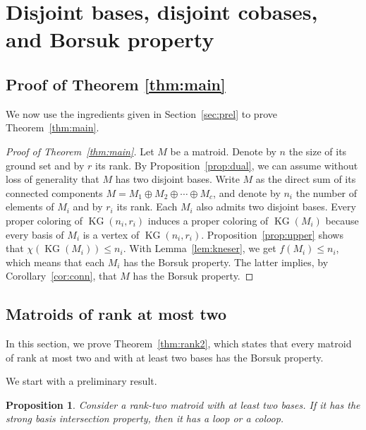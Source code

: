 \documentclass[12pt]{amsart}
\theoremstyle{plain}
\newtheorem{proposition}[theorem]{Proposition}
\theoremstyle{definition}
\theoremstyle{remark}
\renewcommand{\leq}{\leqslant}
\def \KG {\operatorname{KG}}
\begin{document}
\section{Disjoint bases, disjoint cobases, and Borsuk property}
 
\label{sec:disj-borsuk}

\subsection{Proof of Theorem \ref{thm:main}} 

We now use the ingredients given in Section~\ref{sec:prel} to prove Theorem~\ref{thm:main}.

\begin{proof}[Proof of Theorem~\ref{thm:main}]
Let $M$ be a matroid. Denote by $n$ the size of its ground set and by $r$ its rank. By Proposition~\ref{prop:dual}, we can assume without loss of generality that $M$ has two disjoint bases. Write $M$ as the direct sum of its connected components $M = M_1 \oplus M_2 \oplus \cdots \oplus M_c$, and denote by $n_i$ the number of elements of $M_i$ and by $r_i$ its rank. Each $M_i$ also admits two disjoint bases. Every proper coloring of $\KG(n_i,r_i)$ induces a proper coloring of $\KG(M_i)$ because every basis of $M_i$ is a vertex of $\KG(n_i,r_i)$. Proposition~\ref{prop:upper} shows that $\chi(\KG(M_i))\leq n_i$. With Lemma~\ref{lem:kneser}, we get $f(M_i) \leq n_i$, which means that each $M_i$ has the Borsuk property. The latter implies, by Corollary~\ref{cor:conn}, that $M$ has the Borsuk property.
\end{proof}

\subsection{Matroids of rank at most two}\label{subsec:m2}

In this section, we prove Theorem~\ref{thm:rank2}, which states that every matroid of rank at most two and with at least two bases has the Borsuk property.
 
We start with a preliminary result.

\begin{proposition}\label{prop:rank2}
Consider a rank-two matroid with at least two bases. If it has the strong basis intersection property, then it has a loop or a coloop.
\end{proposition}
\end{document}
